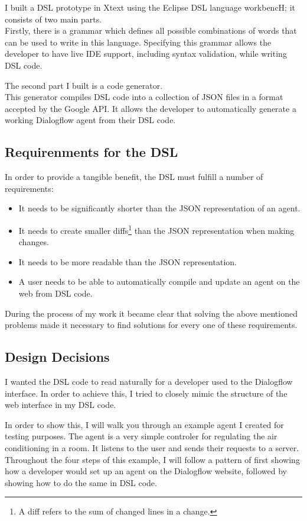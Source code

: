I built a DSL prototype in Xtext using the Eclipse DSL language workbencH; it consists of two main parts.\\
Firstly, there is a grammar which defines all possible combinations of words that can be used to write in this language.
Specifying this grammar allows the developer to have live IDE support, including syntax validation, while writing DSL code.

The second part I built is a code generator.\\
This generator compiles DSL code into a collection of JSON files in a format accepted by the Google API. It allows the developer to automatically generate a working Dialogflow agent from their DSL code.

\subsection{Requirenments for the DSL}

In order to provide a tangible benefit, the DSL must fulfill a number of requirements:
\begin{itemize}
    \item It needs to be significantly shorter than the JSON representation of an agent.
    \item It needs to create smaller diffs\footnote{A diff refers to the sum of changed lines in a change.} than the JSON representation when making changes.
    \item It needs to be more readable than the JSON representation.
    \item A user needs to be able to automatically compile and update an agent on the web from DSL code.
\end{itemize}

During the process of my work it became clear that solving the above mentioned problems made it necessary to find solutions for every one of these requirements.

\subsection{Design Decisions}

I wanted the DSL code to read naturally for a developer used to the Dialogflow interface.
In order to achieve this, I tried to closely mimic the structure of the web interface in my DSL code.

In order to show this, I will walk you through an example agent I created for testing purposes. The agent is a very simple controler for regulating the air conditioning in a room. It listens to the user and sends their requests to a server. Throughout the four steps of this example, I will follow a pattern of first showing how a developer would set up an agent on the Dialogflow website, followed by showing how to do the same in DSL code.

